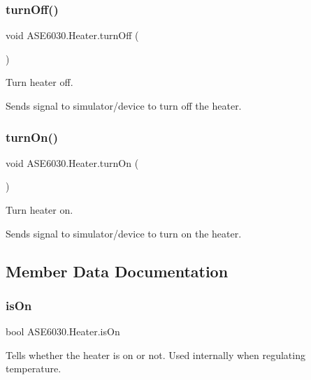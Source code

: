 \subsubsection{\texorpdfstring{turn\+Off()}{turnOff()}}
{\footnotesize\ttfamily void A\+S\+E6030.\+Heater.\+turn\+Off (\begin{DoxyParamCaption}{ }\end{DoxyParamCaption})\hspace{0.3cm}{\ttfamily [inline]}}



Turn heater off. 

Sends signal to simulator/device to turn off the heater. \mbox{\label{class_a_s_e6030_1_1_heater_a0ef024666587dbe494c647214658b412}} 
\subsubsection{\texorpdfstring{turn\+On()}{turnOn()}}
{\footnotesize\ttfamily void A\+S\+E6030.\+Heater.\+turn\+On (\begin{DoxyParamCaption}{ }\end{DoxyParamCaption})\hspace{0.3cm}{\ttfamily [inline]}}



Turn heater on. 

Sends signal to simulator/device to turn on the heater. 

\subsection{Member Data Documentation}
\mbox{\label{class_a_s_e6030_1_1_heater_a1f5b6ffba44e01c20fede806bf409414}} 
\subsubsection{\texorpdfstring{is\+On}{isOn}}
{\footnotesize\ttfamily bool A\+S\+E6030.\+Heater.\+is\+On\hspace{0.3cm}{\ttfamily [private]}}

Tells whether the heater is on or not. Used internally when regulating temperature. \mbox{\label{class_a_s_e6030_1_1_heater_a0f7ba6c365f98047a0e8e7f3017fafab}} 
